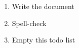 \begin{enumerate}
\item Write the document
\item Spell-check
\item Empty this todo list
\end{enumerate}
